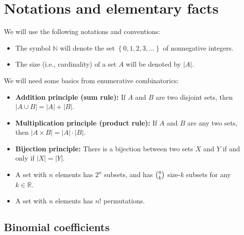 \section{Notations and elementary facts}

We will use the following notations and conventions:

\begin{itemize}
\item The symbol $\mathbb{N}$ will denote the set $\left\{  0,1,2,3,\ldots
\right\}  $ of nonnegative integers.

\item The size (i.e., cardinality) of a set $A$ will be denoted by $\left\vert
A\right\vert $.
\end{itemize}

We will need some basics from enumerative combinatorics:

\begin{itemize}
\item \textbf{Addition principle (sum rule):} If $A$ and $B$ are two disjoint
sets, then $\left\vert A\cup B\right\vert =\left\vert A\right\vert +\left\vert
B\right\vert $.

\item \textbf{Multiplication principle (product rule):} If $A$ and $B$ are any
two sets, then $\left\vert A\times B\right\vert =\left\vert A\right\vert
\cdot\left\vert B\right\vert $.

\item \textbf{Bijection principle:} There is a bijection between two sets $X$ and $Y$ if
and only if $\left\vert X\right\vert =\left\vert Y\right\vert $.

\item A set with $n$ elements has $2^{n}$ subsets, and has $\dbinom{n}{k}$
size-$k$ subsets for any $k\in\mathbb{R}$.

\item A set with $n$ elements has $n!$ permutations.
\end{itemize}

\subsection{Binomial coefficients}

